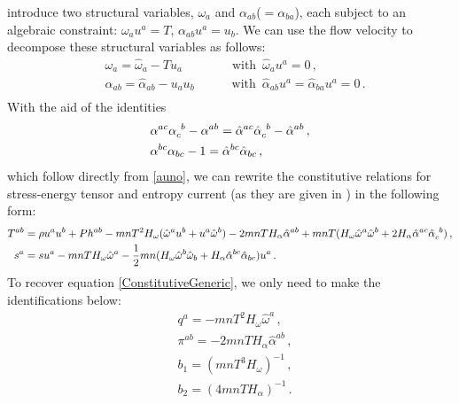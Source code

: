 \documentclass[a4paper, amsfonts, amssymb, amsmath, reprint, showkeys, nofootinbib, twoside, onecolumn, notitlepage]{revtex4-1}
\newcommand{\spc}{\quad \quad \quad}
\theoremstyle{definition}
\theoremstyle{theorem}
\begin{document}
\citet{Stricker2019} introduce two structural variables, $\omega_a$ and $\alpha_{ab}$($=\alpha_{ba}$), each subject to an algebraic constraint: $\omega_a u^a =T$, $\alpha_{ab}u^a=u_b$. 
We can use the flow velocity to decompose these structural variables as follows:
\begin{equation}\label{auno}
\begin{split}
& \omega_a = \hat{\omega}_a -T u_a \spc \quad \text{with } \, \hat{\omega}_a u^a=0 \, ,\\
& \alpha_{ab}=\hat{\alpha}_{ab}-u_a u_b \spc  \text{with } \, \hat{\alpha}_{ab} u^a=\hat{\alpha}_{ba} u^a=0 \, . \\
\end{split}
\end{equation}
With the aid of the identities
\begin{equation}
\begin{split}
& \alpha^{ac}\alpha\indices{_c ^b}-\alpha^{ab}=\hat{\alpha}^{ac}\hat{\alpha}\indices{_c ^b}-\hat{\alpha}^{ab} \, , \\ & \alpha^{bc}\alpha_{bc}-1=\hat{\alpha}^{bc}\hat{\alpha}_{bc} \, , \\
\end{split}
\end{equation}
which follow directly from \eqref{auno}, we can rewrite the constitutive relations for stress-energy tensor and entropy current (as they are given in \cite{Stricker2019}) in the following form:
\begin{equation}
\begin{split}
 T^{ab} ={}& \rho u^a u^b +P h^{ab}-mn T^2 H_\omega (\hat{\omega}^a u^b+ u^a \hat{\omega}^b)-2mnT H_\alpha \hat{\alpha}^{ab}+mnT (H_\omega \hat{\omega}^a \hat{\omega}^b +2H_\alpha \hat{\alpha}^{ac}\hat{\alpha}\indices{_c ^b}) \, , \\
 s^a ={}& s u^a -mnT H_\omega \hat{\omega}^a - \dfrac{1}{2} mn (H_\omega \hat{\omega}^b \hat{\omega}_b + H_\alpha \hat{\alpha}^{bc}\hat{\alpha}_{bc}) u^a \, . \\
\end{split}
\end{equation}
To recover equation \eqref{ConstitutiveGeneric}, we only need to make the identifications below:
\begin{equation}\label{leprime4}
\begin{split}
& q^a = -mnT^2 H_\omega \hat{\omega}^a \, ,\\
& \pi^{ab} = -2mnTH_\alpha \hat{\alpha}^{ab} \, ,  \\
& b_1 = (mnT^3 H_\omega)^{-1} \, , \\
& b_2 = (4mnTH_\alpha)^{-1} \, . \\
\end{split} 
\end{equation}
\end{document}
